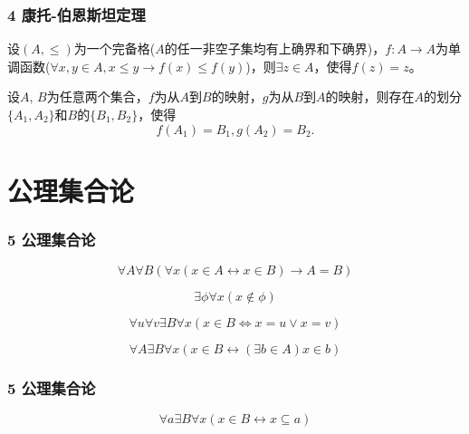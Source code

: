 \documentclass{beamer}
\begin{document}
\begin{CJK*}{UTF8}{gbsn}
\begin{frame}
  \frametitle{4 康托-伯恩斯坦定理}
  \begin{Thm}[塔斯基不动点定理]
    设$(A, \leq)$为一个完备格($A$的任一非空子集均有上确界和下确界)，$f:A \to A$为单调函数($\forall x, y \in A, x \leq y \rightarrow f(x) \leq f(y)$)，则$\exists z \in A$，使得$f(z)=z$。
  \end{Thm}
  \begin{Thm}[巴拿赫映射分解定理]
    设$A$, $B$为任意两个集合，$f$为从$A$到$B$的映射，$g$为从$B$到$A$的映射，则存在$A$的划分$\{A_1,A_2\}$和$B$的$\{B_1,B_2\}$，使得\[f(A_1) = B_1,g(A_2) = B_2.\]
  \end{Thm}
\end{frame}

\section{公理集合论}
\begin{frame}
  \frametitle{5 公理集合论}
  \begin{Ax}[外延公理]
    \begin{equation*}
      \forall A \forall B (\forall x (x \in A \leftrightarrow x\in B)\rightarrow A = B)
    \end{equation*}
  \end{Ax}
  \begin{Ax}[空集公理]
    \begin{equation*}
      \exists \phi \forall x (x \notin \phi)
    \end{equation*}
  \end{Ax}
  \begin{Ax}[对公理]
    \begin{equation*}
      \forall u \forall v \exists B \forall x (x \in B \Leftrightarrow x = u \lor x = v)
    \end{equation*}
  \end{Ax}
  \begin{Ax}[并集公理]
    \begin{equation*}
     \forall A \exists B \forall x (x \in B \leftrightarrow (\exists b \in A) x \in b)
    \end{equation*}
  \end{Ax}
\end{frame}
\begin{frame}
  \frametitle{5 公理集合论}
    \begin{Ax}[幂集公理]
    \begin{equation*}
      \forall a \exists B \forall x ( x \in B \leftrightarrow x \subseteq a)

\end{equation*}
\end{Ax}
\end{frame}
\end{CJK*}
\end{document}
